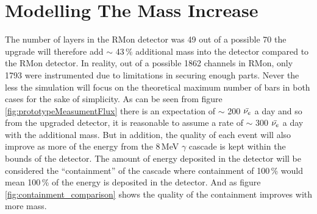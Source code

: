 \begin{figure}[!h]
\begin{minipage}{.45\textwidth}
  \label{fig:delayedIbdTimes}
  \vspace{0.6327cm}%
\end{minipage}
\end{figure}

\section{Modelling The Mass Increase}
The number of layers in the RMon detector was 49 out of a possible 70 the upgrade will therefore add $\sim$ 43\,\% additional mass into the detector compared to the RMon detector. In reality, out of a possible 1862 channels in RMon, only 1793 were instrumented due to limitations in securing enough parts. Never the less the simulation will focus on the theoretical maximum number of bars in both cases for the sake of simplicity. As can be seen from figure \ref{fig:prototypeMeasumentFlux} there is an expectation of $\sim$ 200 $\Bar{\nu_e}$ a day and so from the upgraded detector, it is reasonable to assume a rate of $\sim$ 300 $\Bar{\nu_e}$ a day with the additional mass. But in addition, the quality of each event will also improve as more of the energy from the 8\,MeV $\gamma$ cascade is kept within the bounds of the detector. The amount of energy deposited in the detector will be considered the ``containment'' of the cascade where containment of 100\,\% would mean 100\,\% of the energy is deposited in the detector. And as figure \ref{fig:containment_comparison} shows the quality of the containment improves with more mass. %

